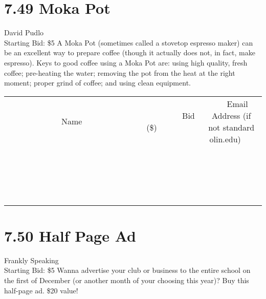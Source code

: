 \documentclass[11pt]{article}
\begin{document}
\section*{7.49 Moka Pot}
David Pudlo
\\
Starting Bid: \$5
\newline
A Moka Pot (sometimes called a stovetop espresso maker) can be an excellent way to prepare coffee (though it actually does not, in fact, make espresso). Keys to good coffee using a Moka Pot are: using high quality, fresh coffee; pre-heating the water; removing the pot from the heat at the right moment; proper grind of coffee; and using clean equipment.
\\[3ex]
\begin{tabular}{c c c}
~~~~~~~~~~~~~Name~~~~~~~~~~~~~ & ~~~~~~~~~Bid (\$)~~~~~~~~~  & ~~~Email Address (if not standard olin.edu)~~~\\
 & & \\
\hline
 & & \\
\hline
 & & \\
\hline
 & & \\
\hline
 & & \\
\hline
 & & \\
\hline
 & & \\
\hline
 & & \\
\hline
 & & \\
\hline
 & & \\
\hline
 & & \\
\hline
 & & \\
\hline
 & & \\
\hline
 & & \\
\hline
 & & \\
\hline
 & & \\
\hline
 & & \\
\hline
 & & \\
\hline
 & & \\
\hline
\end{tabular}
\newpage
\section*{7.50 Half Page Ad}
Frankly Speaking
\\
Starting Bid: \$5
\newline
Wanna advertise your club or business to the entire school on the first of December (or another month of your choosing this year)? Buy this half-page ad. \$20 value!
\end{document}
